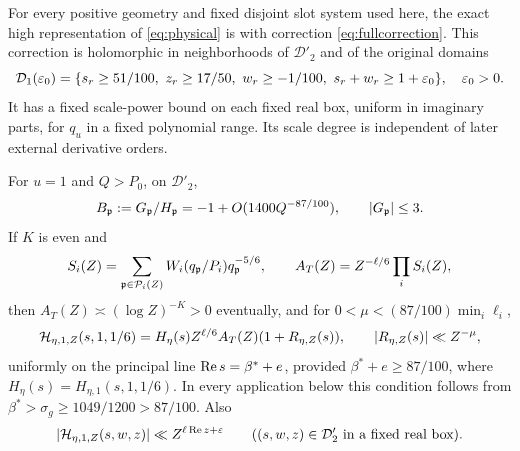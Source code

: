 \begin{proposition}\label{prop:correction}
For every positive geometry and fixed disjoint slot system used here, the exact high representation of \eqref{eq:physical} is  with correction \eqref{eq:fullcorrection}. This correction is holomorphic in neighborhoods of $\mathcal D'_2$ and of the original domains
\[
 \mathcal D_1(\varepsilon_0)=\{s_r\ge51/100,\ z_r\ge17/50,\ w_r\ge-1/100,
                       \ s_r+w_r\ge1+\varepsilon_0\},\quad\varepsilon_0>0.
\]
It has a fixed scale-power bound on each fixed real box, uniform in imaginary parts, for $q_u$ in a fixed polynomial range. Its scale degree is independent of later external derivative orders.

For $u=1$ and $Q>P_0$, on $\mathcal D'_2$,
\[
 B_\mathfrak p:=G_\mathfrak p/H_\mathfrak p=-1+O(1400Q^{-87/100}),\qquad |G_\mathfrak p|\le3.
\]
If $K$ is even and
\begin{equation}\label{eq:normalizer}
 S_i(Z)=\sum_{\mathfrak p\in\mathcal P_i(Z)}W_i(q_\mathfrak p/P_i)q_\mathfrak p^{-5/6},\qquad
 A_T(Z)=Z^{-\ell/6}\prod_i S_i(Z),
\end{equation}
then $A_T(Z)\asymp(\log Z)^{-K}>0$ eventually, and for $0<\mu<(87/100)\min_i\ell_i$,
\begin{equation}\label{eq:residuecorrection}
 \mathcal H_{\eta,1,Z}(s,1,1/6)
 =H_\eta(s)Z^{\ell/6}A_T(Z)(1+R_{\eta,Z}(s)),\qquad
 |R_{\eta,Z}(s)|\ll Z^{-\mu},
\end{equation}
uniformly on the principal line $\operatorname{Re} s=\beta^*+e$, provided
$\beta^*+e\ge87/100$, where $H_\eta(s)=H_{\eta,1}(s,1,1/6)$.
In every application below this condition follows from
$\beta^*>\sigma_g\ge1049/1200>87/100$. Also
\begin{equation}\label{eq:principalabsolute}
 |\mathcal H_{\eta,1,Z}(s,w,z)|\ll Z^{\ell\operatorname{Re} z+\varepsilon}
 \qquad ((s,w,z)\in\mathcal D'_2\text{ in a fixed real box}).
\end{equation}
\end{proposition}
